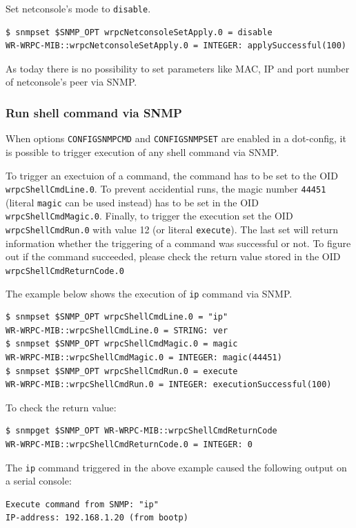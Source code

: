 \documentclass[a4paper, 12pt]{article}
\renewcommand{\_}{\underscore\allowbreak}
\begin{document}
Set netconsole's mode to \texttt{disable}.
\begin{lstlisting}
$ snmpset $SNMP_OPT wrpcNetconsoleSetApply.0 = disable
WR-WRPC-MIB::wrpcNetconsoleSetApply.0 = INTEGER: applySuccessful(100)
\end{lstlisting}


As today there is no possibility to set parameters like MAC, IP and port number
of netconsole's peer via SNMP.

\subsubsection{Run shell command via SNMP}
\label{Run shell command via SNMP}

When options \texttt{CONFIG\_SNMP\_CMD} and \texttt{CONFIG\_SNMP\_SET} are
enabled in a dot-config, it is possible to trigger execution of any shell
command via SNMP.

To trigger an exectuion of a command, the command has to be set to
the OID \texttt{wrpcShellCmdLine.0}. To prevent accidential runs, the magic
number \texttt{44451} (literal \texttt{magic} can be used instead) has to be
set in the OID \texttt{wrpcShellCmdMagic.0}.
Finally, to trigger the execution set the OID \texttt{wrpcShellCmdRun.0} with
value 12 (or literal \texttt{execute}). The last set will return information
whether the triggering of a command was successful or not. To figure out if
the command succeeded, please check the return value stored in the OID
\texttt{wrpcShellCmdReturnCode.0}

The example below shows the execution of \texttt{ip} command via SNMP.
\begin{lstlisting}
$ snmpset $SNMP_OPT wrpcShellCmdLine.0 = "ip"
WR-WRPC-MIB::wrpcShellCmdLine.0 = STRING: ver
$ snmpset $SNMP_OPT wrpcShellCmdMagic.0 = magic
WR-WRPC-MIB::wrpcShellCmdMagic.0 = INTEGER: magic(44451)
$ snmpset $SNMP_OPT wrpcShellCmdRun.0 = execute
WR-WRPC-MIB::wrpcShellCmdRun.0 = INTEGER: executionSuccessful(100)
\end{lstlisting}

To check the return value:
\begin{lstlisting}
$ snmpget $SNMP_OPT WR-WRPC-MIB::wrpcShellCmdReturnCode
WR-WRPC-MIB::wrpcShellCmdReturnCode.0 = INTEGER: 0
\end{lstlisting}

The \texttt{ip} command triggered in the above example caused the following
output on a serial console:
\begin{lstlisting}
Execute command from SNMP: "ip"
IP-address: 192.168.1.20 (from bootp)
\end{lstlisting}
\end{document}
